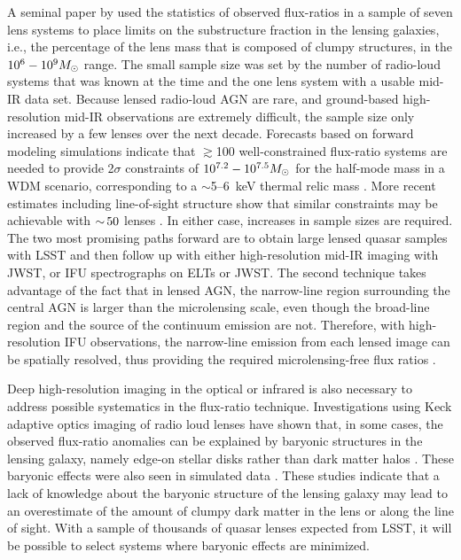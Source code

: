 A seminal paper by \cite{Dalal:2002aa} used the statistics of observed flux-ratios in a sample of seven lens systems to place limits on the substructure fraction in the lensing galaxies, i.e., the percentage of the lens mass that is composed of clumpy structures, in the $10^6 - 10^9 M_\odot$ range.
The small sample size was set by the number of radio-loud systems that was known at the time and the one lens system with a usable mid-IR data set.  
Because lensed radio-loud AGN are rare, and ground-based high-resolution mid-IR observations are extremely difficult, the sample size only increased by a few lenses over the next decade.  
Forecasts based on forward modeling simulations indicate that $\gtrsim$100 well-constrained flux-ratio systems are needed to provide 2$\sigma$ constraints of $10^{7.2} - 10^{7.5} M_\odot$ for the half-mode mass in a WDM scenario, corresponding to a $\sim$5--6~keV thermal relic mass \citep{Gilman++18}.
More recent estimates including line-of-sight structure show that similar constraints may be achievable with $ {\sim}\, 50$ lenses \citep{1901.11031}.
In either case, increases in sample sizes are required.
The two most promising paths forward are to obtain large lensed quasar samples with LSST and then follow up with either high-resolution mid-IR imaging with JWST, or IFU spectrographs on ELTs or JWST.  The second technique takes advantage of the fact that in lensed AGN, the narrow-line region surrounding the central AGN is larger than the microlensing scale, even though the broad-line region and the source of the continuum emission are not.  Therefore, with high-resolution IFU observations, the narrow-line emission from each lensed image can be spatially resolved, thus providing the required microlensing-free flux ratios \citep{MoustakasMetcalf03, Nierenberg++14, Nierenberg:2017vlg}.

Deep high-resolution imaging in the optical or infrared is also necessary to address possible systematics in the flux-ratio technique.  
Investigations using Keck adaptive optics imaging of radio loud lenses have shown that, in some cases, the observed flux-ratio anomalies can be explained by baryonic structures in the lensing galaxy, namely edge-on stellar disks rather than dark matter halos \citep{Hsueh++2016, Hsueh++2017}.
These baryonic effects were also seen in simulated data \citep{Gilman++2017, Hsueh++2018}.
These studies indicate that a lack of knowledge about the baryonic structure of the lensing galaxy may lead to an overestimate of the amount of clumpy dark matter in the lens or along the line of sight.
With a sample of thousands of quasar lenses expected from LSST, it will be possible to select systems where baryonic effects are minimized.

